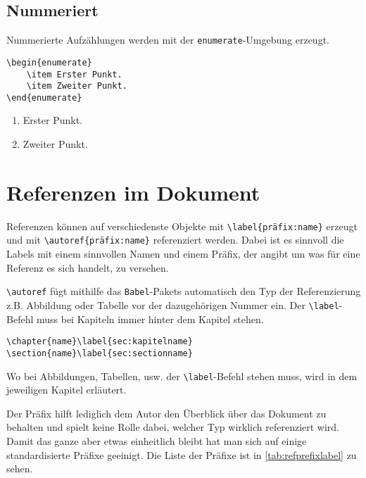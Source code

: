 \subsection{Nummeriert}
Nummerierte Aufzählungen werden mit der \verb|enumerate|-Umgebung erzeugt.
\begin{lstlisting}[style=latex]
\begin{enumerate}
	\item Erster Punkt.
	\item Zweiter Punkt.
\end{enumerate}
\end{lstlisting}
\begin{enumerate}
	\item Erster Punkt.
	\item Zweiter Punkt.
\end{enumerate}

\section{Referenzen im Dokument}
Referenzen können auf verschiedenste Objekte mit \verb|\label{präfix:name}| erzeugt und mit  \verb|\autoref{präfix:name}| referenziert werden. Dabei ist es sinnvoll die Labels mit einem sinnvollen Namen und einem Präfix, der angibt um was für eine Referenz es sich handelt, zu versehen. 

\verb|\autoref| fügt mithilfe das \verb|Babel|-Pakets automatisch den Typ der Referenzierung z.B. Abbildung oder Tabelle vor der dazugehörigen Nummer ein. Der \verb|\label|-Befehl muss bei Kapiteln immer hinter dem Kapitel stehen.
\begin{lstlisting}[style=latex]
\chapter{name}\label{sec:kapitelname}
\section{name}\label{sec:sectionname}
\end{lstlisting}
Wo bei Abbildungen, Tabellen, usw. der \verb|\label|-Befehl stehen muss, wird in dem jeweiligen Kapitel erläutert.

Der Präfix hilft lediglich dem Autor den Überblick über das Dokument zu behalten und spielt keine Rolle dabei, welcher Typ wirklich referenziert wird. Damit das ganze aber etwas einheitlich bleibt hat man sich auf einige standardisierte Präfixe geeinigt. Die Liste der Präfixe ist in \autoref{tab:refprefixlabel} zu sehen.

